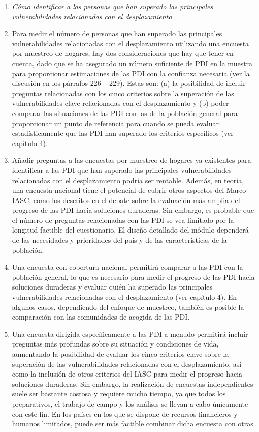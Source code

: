 \documentclass[
]{book}
\begin{document}
\begin{enumerate}
\item
  \emph{Cómo identificar a las personas que han superado las principales vulnerabilidades relacionadas con el desplazamiento}
\item
  Para medir el número de personas que han superado las principales vulnerabilidades relacionadas con el desplazamiento utilizando una encuesta por muestreo de hogares, hay dos consideraciones que hay que tener en cuenta, dado que se ha asegurado un número suficiente de PDI en la muestra para proporcionar estimaciones de las PDI con la confianza necesaria (ver la discusión en los párrafos 226- --229). Estas son: (a) la posibilidad de incluir preguntas relacionadas con los cinco criterios sobre la superación de las vulnerabilidades clave relacionadas con el desplazamiento y (b) poder comparar las situaciones de las PDI con las de la población general para proporcionar un punto de referencia para cuando se pueda evaluar estadísticamente que las PDI han superado los criterios específicos (ver capítulo 4).
\item
  Añadir preguntas a las encuestas por muestreo de hogares ya existentes para identificar a las PDI que han superado las principales vulnerabilidades relacionadas con el desplazamiento podría ser rentable. Además, en teoría, una encuesta nacional tiene el potencial de cubrir otros aspectos del Marco IASC, como los descritos en el debate sobre la evaluación más amplia del progreso de las PDI hacia soluciones duraderas. Sin embargo, es probable que el número de preguntas relacionadas con las PDI se vea limitado por la longitud factible del cuestionario. El diseño detallado del módulo dependerá de las necesidades y prioridades del país y de las características de la población.
\item
  Una encuesta con cobertura nacional permitirá comparar a las PDI con la población general, lo que es necesario para medir el progreso de las PDI hacia soluciones duraderas y evaluar quién ha superado las principales vulnerabilidades relacionadas con el desplazamiento (ver capítulo 4). En algunos casos, dependiendo del enfoque de muestreo, también es posible la comparación con las comunidades de acogida de las PDI.
\item
  Una encuesta dirigida específicamente a las PDI a menudo permitirá incluir preguntas más profundas sobre su situación y condiciones de vida, aumentando la posibilidad de evaluar los cinco criterios clave sobre la superación de las vulnerabilidades relacionadas con el desplazamiento, así como la inclusión de otros criterios del IASC para medir el progreso hacia soluciones duraderas. Sin embargo, la realización de encuestas independientes suele ser bastante costosa y requiere mucho tiempo, ya que todos los preparativos, el trabajo de campo y los análisis se llevan a cabo únicamente con este fin. En los países en los que se dispone de recursos financieros y humanos limitados, puede ser más factible combinar dicha encuesta con otras.

\end{enumerate}
\end{document}
